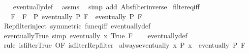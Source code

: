 \begin{isabellebody}
%
\isadelimproof
\ \ %
\endisadelimproof
%
\isatagproof
{}\isamarkupfalse%
\ eventually{\isacharunderscore}{\kern0pt}def\ \isamarkupfalse%
\ assms\ \isamarkupfalse%
\ {\isacharparenleft}{\kern0pt}simp\ add{\isacharcolon}{\kern0pt}\ Abs{\isacharunderscore}{\kern0pt}filter{\isacharunderscore}{\kern0pt}inverse{\isacharparenright}{\kern0pt}%
\endisatagproof
{\isafoldproof}%
%
\isadelimproof
\isanewline
%
\endisadelimproof
\isanewline
{}\isamarkupfalse%
\ filter{\isacharunderscore}{\kern0pt}eq{\isacharunderscore}{\kern0pt}iff{\isacharcolon}{\kern0pt}\isanewline
\ \ \ {\isachardoublequoteopen}F\ {\isacharequal}{\kern0pt}\ F{\isacharprime}{\kern0pt}\ {\isasymlongleftrightarrow}\ {\isacharparenleft}{\kern0pt}{\isasymforall}P{\isachardot}{\kern0pt}\ eventually\ P\ F\ {\isacharequal}{\kern0pt}\ eventually\ P\ F{\isacharprime}{\kern0pt}{\isacharparenright}{\kern0pt}{\isachardoublequoteclose}\isanewline
%
\isadelimproof
\ \ %
\endisadelimproof
%
\isatagproof
{}\isamarkupfalse%
\ Rep{\isacharunderscore}{\kern0pt}filter{\isacharunderscore}{\kern0pt}inject\ {\isacharbrackleft}{\kern0pt}symmetric{\isacharbrackright}{\kern0pt}\ fun{\isacharunderscore}{\kern0pt}eq{\isacharunderscore}{\kern0pt}iff\ eventually{\isacharunderscore}{\kern0pt}def\ \isacommand{{\isachardot}{\kern0pt}{\isachardot}{\kern0pt}}\isamarkupfalse%
%
\endisatagproof
{\isafoldproof}%
%
\isadelimproof
\isanewline
%
\endisadelimproof
\isanewline
{}\isamarkupfalse%
\ eventually{\isacharunderscore}{\kern0pt}True\ {\isacharbrackleft}{\kern0pt}simp{\isacharbrackright}{\kern0pt}{\isacharcolon}{\kern0pt}\ {\isachardoublequoteopen}eventually\ {\isacharparenleft}{\kern0pt}{\isasymlambda}x{\isachardot}{\kern0pt}\ True{\isacharparenright}{\kern0pt}\ F{\isachardoublequoteclose}\isanewline
%
\isadelimproof
\ \ %
\endisadelimproof
%
\isatagproof
{}\isamarkupfalse%
\ eventually{\isacharunderscore}{\kern0pt}def\isanewline
\ \ \isamarkupfalse%
\ {\isacharparenleft}{\kern0pt}rule\ is{\isacharunderscore}{\kern0pt}filter{\isachardot}{\kern0pt}True\ {\isacharbrackleft}{\kern0pt}OF\ is{\isacharunderscore}{\kern0pt}filter{\isacharunderscore}{\kern0pt}Rep{\isacharunderscore}{\kern0pt}filter{\isacharbrackright}{\kern0pt}{\isacharparenright}{\kern0pt}%
\endisatagproof
{\isafoldproof}%
%
\isadelimproof
\isanewline
%
\endisadelimproof
\isanewline
{}\isamarkupfalse%
\ always{\isacharunderscore}{\kern0pt}eventually{\isacharcolon}{\kern0pt}\ {\isachardoublequoteopen}{\isasymforall}x{\isachardot}{\kern0pt}\ P\ x\ {\isasymLongrightarrow}\ eventually\ P\ F{\isachardoublequoteclose}\isanewline

\end{isabellebody}
